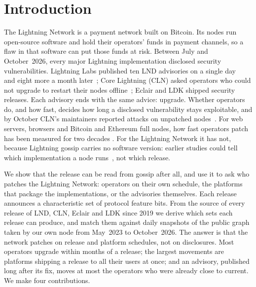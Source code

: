 \section{Introduction}
\label{sec:intro}

The Lightning Network is a payment network built on Bitcoin. Its nodes run open-source software and hold their
operators' funds in payment channels, so a flaw in that software can put those funds at risk. Between July and
October~2026, every major Lightning implementation disclosed security vulnerabilities. Lightning
Labs published ten LND advisories on a single day~\cite{lightninglabs2026aug} and eight more a month
later~\cite{lightninglabs2026sep}; Core Lightning (CLN) asked operators who could not upgrade to restart their nodes
offline~\cite{coreln2026offline}; Eclair and LDK shipped security releases. Each advisory ends with the same advice:
upgrade. Whether operators do, and how fast, decides how long a disclosed vulnerability stays exploitable, and by
October CLN's maintainers reported attacks on unpatched nodes~\cite{coreln2026attacks}. For web servers, browsers and
Bitcoin and Ethereum full nodes, how fast operators patch has been measured for two decades
\cite{arbaugh2000windows,rescorla2003securityholes,frei2009firefox,durumeric2014heartbleed,kim2018ethereum}. For the
Lightning Network it has not, because Lightning gossip carries no software version: earlier studies could tell which
implementation a node runs~\cite{zabka2021nodeclassification,espinasa2024decisiontree,kumar2026clientdiversity}, not
which release.

We show that the release can be read from gossip after all, and use it to ask who patches the Lightning Network:
operators on their own schedule, the platforms that package the implementations, or the advisories themselves. Each
release announces a characteristic set of protocol feature bits. From the source of every release of LND, CLN, Eclair
and LDK since 2019 we derive which sets each release can produce, and match them against \DataUsableDays{} daily
snapshots of the public graph taken by our own node from May~2023 to October~2026. The answer is that the network
patches on release and platform schedules, not on disclosures. Most operators upgrade within months of a release;
the largest movements are platforms shipping a release to all their users at once; and an advisory, published long
after its fix, moves at most the operators who were already close to current. We make four contributions.

